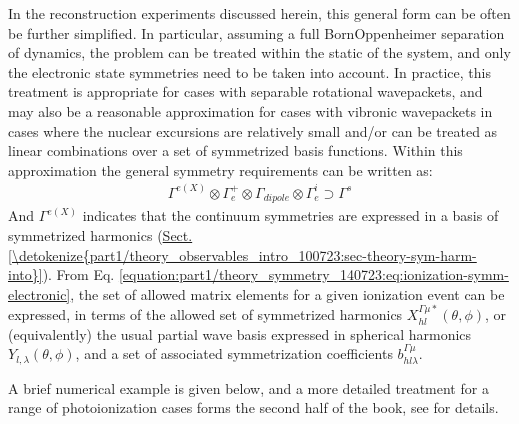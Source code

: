 \documentclass[letterpaper,table,10pt,english]{jupyterBook}
\begin{document}
\sphinxAtStartPar
In the reconstruction experiments discussed herein, this general form can be often be further simplified. In particular, assuming a full Born\sphinxhyphen{}Oppenheimer separation of dynamics, the problem can be treated within the static {\hyperref[\detokenize{backmatter/glossary:term-PG}]{}} of the system, and only the electronic state symmetries need to be taken into account. In practice, this treatment is appropriate for cases with separable rotational wavepackets, and may also be a reasonable approximation for cases with vibronic wavepackets in cases where the nuclear excursions are relatively small and/or can be treated as linear combinations over a set of symmetrized basis functions. Within this approximation the general symmetry requirements can be written as:
\begin{equation}\label{equation:part1/theory_symmetry_140723:eq:ionization-symm-electronic}
\begin{split}
\Gamma^{e(X)}\otimes\Gamma_{e}^{+}\otimes\Gamma_{dipole}\otimes\Gamma_{e}^{i}\supset\Gamma^{s}
\end{split}
\end{equation}
\sphinxAtStartPar
And \(\Gamma^{e(X)}\) indicates that the continuum symmetries are expressed in a basis of symmetrized harmonics (\hyperref[\detokenize{part1/theory_observables_intro_100723:sec-theory-sym-harm-into}]{Sect.\@ \ref{\detokenize{part1/theory_observables_intro_100723:sec-theory-sym-harm-into}}}). From Eq. \eqref{equation:part1/theory_symmetry_140723:eq:ionization-symm-electronic}, the set of allowed matrix elements for a given ionization event can be expressed, in terms of the allowed set of symmetrized harmonics \(X_{hl}^{\Gamma\mu*}(\theta,\phi)\), or (equivalently) the usual partial wave basis expressed in spherical harmonics \(Y_{l,\lambda}(\theta,\phi)\), and a set of associated symmetrization coefficients \(b_{hl\lambda}^{\Gamma\mu}\).

\sphinxAtStartPar
A brief numerical example is given below, and a more detailed treatment for a range of photoionization cases forms the second half of the book, see  for details.
\end{document}
